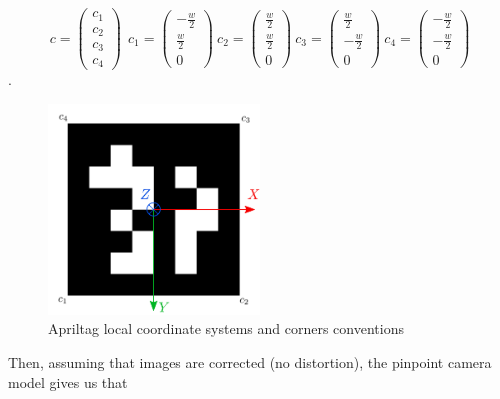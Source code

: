 \begin{equation}
    c =
    \begin{pmatrix}
    c_1 \\ c_2 \\ c_3 \\ c_4
    \end{pmatrix}
    ~~
    c_1 =  \begin{pmatrix} -\frac{w}{2} \\ \frac{w}{2} \\ 0 \end{pmatrix}
    ~ 
    c_2 =  \begin{pmatrix} \frac{w}{2} \\ \frac{w}{2} \\ 0 \end{pmatrix}
    ~
    c_3 =  \begin{pmatrix} \frac{w}{2} \\ -\frac{w}{2} \\ 0 \end{pmatrix}
    ~
    c_4 =  \begin{pmatrix} -\frac{w}{2} \\ -\frac{w}{2} \\ 0 \end{pmatrix}
\end{equation}.

%
\begin{figure}
    \centering
    \includegraphics[width=0.5\textwidth]{figures/tag12_frame.pdf}
    \caption{Apriltag local coordinate systems and corners conventions \cite{wang2016iros}}
    \label{fig:tag_coordinate_frame}
\end{figure}

Then, assuming that images are corrected (no distortion), the pinpoint camera model gives us that

